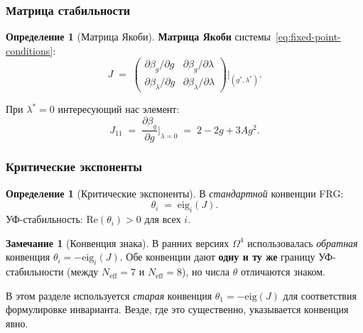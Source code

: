 \documentclass[11pt,a4paper]{article}
\newcommand{\Om}{\ensuremath{\Omega^4}}
\theoremstyle{definition}
\newtheorem{definition}[theorem]{Определение}
\newtheorem{remark}[theorem]{Замечание}
\begin{document}
\subsubsection{Матрица стабильности}

\begin{definition}[Матрица Якоби]
\label{def:jacobian}
\textbf{Матрица Якоби} системы~\eqref{eq:fixed-point-conditions}:
\begin{equation}
    J \;=\; \begin{pmatrix}
        \partial \beta_g / \partial g & \partial \beta_g / \partial \lambda \\[0.3em]
        \partial \beta_\lambda / \partial g & \partial \beta_\lambda / \partial \lambda
    \end{pmatrix}\bigg|_{(g^*, \lambda^*)}.
    \label{eq:jacobian}
\end{equation}
\end{definition}

\medskip\noindent
При $\lambda^* = 0$ интересующий нас элемент:
\begin{equation}
    \boxed{
    J_{11} \;=\; \frac{\partial \beta_g}{\partial g}\bigg|_{\lambda = 0}
    \;=\; 2 - 2g + 3A g^2.
    }
    \label{eq:J11}
\end{equation}

\subsubsection{Критические экспоненты}

\begin{definition}[Критические экспоненты]
\label{def:critical-exponents}
В \emph{стандартной} конвенции FRG:
\begin{equation}
    \theta_i \;=\; \mathrm{eig}_i(J).
    \label{eq:theta-std}
\end{equation}
УФ-стабильность: $\mathrm{Re}(\theta_i) > 0$ для всех $i$.
\end{definition}

\begin{remark}[Конвенция знака]
\label{rem:theta-convention}
В ранних версиях $\Om$ использовалась \emph{обратная} конвенция
$\theta_i = -\mathrm{eig}_i(J)$. Обе конвенции дают \textbf{одну
и ту же} границу УФ-стабильности (между $N_{\text{eff}} = 7$
и $N_{\text{eff}} = 8$), но числа $\theta$ отличаются знаком.

В этом разделе используется \emph{старая} конвенция
$\theta_1 = -\mathrm{eig}(J)$ для соответствия формулировке
инварианта. Везде, где это существенно, указывается конвенция явно.
\end{remark}
\end{document}
